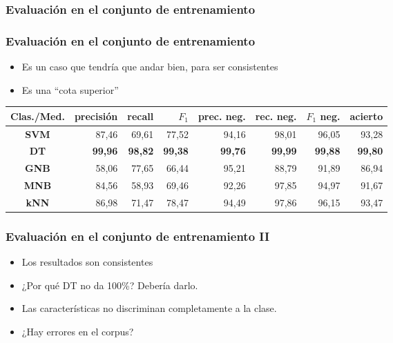 \subsubsection{Evaluación en el conjunto de entrenamiento}
\begin{frame}
    \frametitle{Evaluación en el conjunto de entrenamiento}

    \begin{itemize}
        \item Es un caso que tendría que andar bien, para ser consistentes
        \item Es una ``cota superior''
    \end{itemize}

    \begin{center}
        \scriptsize
        \begin{tabular}{ c | r | r | r | r | r | r | r }
            \textbf{Clas./Med.} & precisión & recall & $F_1$ & prec. neg. & rec. neg. & $F_1$ neg. & acierto \\
            \hline
            \textbf{SVM} & 87,46 & 69,61 & 77,52 & 94,16 & 98,01 & 96,05 & 93,28\\
            \hline
            \textbf{DT} & \textbf{99,96} & \textbf{98,82} & \textbf{99,38} & \textbf{99,76} & \textbf{99,99} & \textbf{99,88} & \textbf{99,80} \\
            \hline
            \textbf{GNB} & 58,06 & 77,65 & 66,44 & 95,21 & 88,79 & 91,89 & 86,94 \\
            \hline
            \textbf{MNB} & 84,56 & 58,93 & 69,46 & 92,26 & 97,85 & 94,97 & 91,67 \\
            \hline
            \textbf{kNN} & 86,98 & 71,47 & 78,47 & 94,49 & 97,86 & 96,15 & 93,47 \\
        \end{tabular}
    \end{center}
\end{frame}

\begin{frame}
    \frametitle{Evaluación en el conjunto de entrenamiento II}

    \begin{itemize}[<+->]
        \item Los resultados son consistentes
        \item ¿Por qué DT no da 100\%? Debería darlo.
        \item Las características no discriminan completamente a la clase.
        \item ¿Hay errores en el corpus?
    \end{itemize}
\end{frame}

